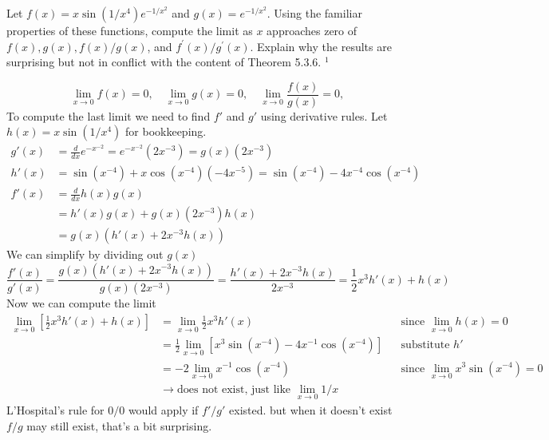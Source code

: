 \begin{exercise}
  Let $f(x)=x \sin \left(1 / x^{4}\right) e^{-1 / x^{2}}$ and $g(x)=e^{-1 / x^{2}}$. Using the familiar properties of these functions, compute the limit as $x$ approaches zero of $f(x), g(x), f(x) / g(x)$, and $f^{\prime}(x) / g^{\prime}(x)$. Explain why the results are surprising but not in conflict with the content of Theorem 5.3.6. ${ }^{1}$
\end{exercise}
\begin{solution}
  $$
  \lim_{x \to 0} f(x) = 0,
  \quad \lim_{x \to 0} g(x) = 0,
  \quad \lim_{x \to 0} \frac{f(x)}{g(x)} = 0,
  $$
  To compute the last limit we need to find $f'$ and $g'$ using derivative rules. Let $h(x) = x\sin(1/x^4)$ for bookkeeping.
  $$
  \begin{aligned}
    g'(x) &= \frac{d}{dx} e^{-x^{-2}} = e^{-x^{-2}}(2x^{-3}) = g(x)(2x^{-3}) \\
    h'(x) &= \sin(x^{-4}) + x\cos(x^{-4})(-4x^{-5}) = \sin(x^{-4}) - 4x^{-4}\cos(x^{-4})\\
    f'(x) &= \frac{d}{dx} h(x)g(x) \\
          &= h'(x)g(x) + g(x)(2x^{-3})h(x) \\
          &= g(x)(h'(x) + 2x^{-3}h(x))
  \end{aligned}
  $$
  We can simplify by dividing out $g(x)$
  $$
  \frac{f'(x)}{g'(x)}
  = \frac{g(x)(h'(x) + 2x^{-3}h(x))}{g(x)(2x^{-3})}
  = \frac{h'(x) + 2x^{-3}h(x)}{2x^{-3}}
  = \frac 12 x^3h'(x) + h(x)
  $$
  Now we can compute the limit
  $$
  \begin{aligned}
  \lim_{x \to 0}\left[\frac 12 x^3 h'(x) + h(x)\right]
  &= \lim_{x \to 0} \frac 12 x^3 h'(x) &&{\text{since } \lim_{x\to 0} h(x) = 0} \\
  &= \frac 12 \lim_{x \to 0}\left[x^3\sin(x^{-4}) - 4x^{-1}\cos(x^{-4})\right] &&{\text{substitute } h'} \\
  &= -2 \lim_{x \to 0} x^{-1}\cos(x^{-4}) &&{\text{since } \lim_{x \to 0} x^3\sin(x^{-4}) = 0} \\
  &\to \text{does not exist, just like } \lim_{x \to 0} 1/x
  \end{aligned}
  $$
  L'Hospital's rule for $0/0$ would apply if $f'/g'$ existed. but when it doesn't exist $f/g$ may still exist, that's a bit surprising.
\end{solution}

